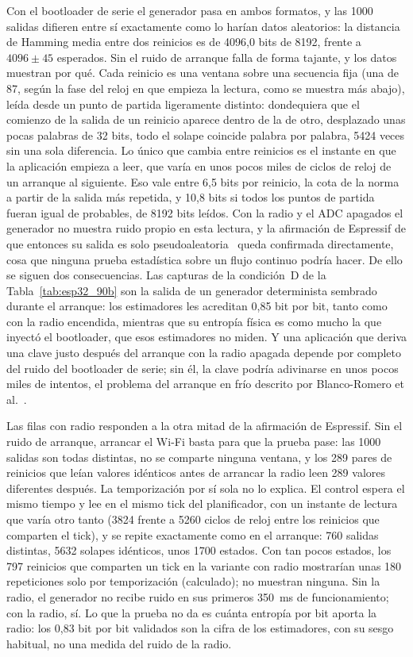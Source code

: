 Con el bootloader de serie el generador pasa en ambos formatos, y las
1000 salidas difieren entre sí exactamente como lo harían datos
aleatorios: la distancia de Hamming media entre dos reinicios es de 4096,0
bits de 8192, frente a $4096 \pm 45$ esperados. Sin el ruido de arranque
falla de forma tajante, y los datos muestran por qué. Cada reinicio es una
ventana sobre una secuencia fija (una de 87, según la fase del reloj en
que empieza la lectura, como se muestra más abajo), leída desde un punto de partida
ligeramente distinto: dondequiera que el comienzo de la salida de un
reinicio aparece dentro de la de otro, desplazado unas pocas palabras de
32 bits, todo el solape coincide palabra por palabra, 5424 veces sin una
sola diferencia. Lo único que cambia entre reinicios es el instante en que
la aplicación empieza a leer, que varía en unos pocos miles de ciclos de
reloj de un arranque al siguiente. Eso vale entre 6,5 bits por reinicio,
la cota de la norma a partir de la salida más repetida, y 10,8 bits si
todos los puntos de partida fueran igual de probables, de 8192 bits leídos.
Con la radio y el ADC apagados el generador no muestra ruido propio en
esta lectura, y la
afirmación de Espressif de que entonces su salida es solo
pseudoaleatoria~\cite{espressif_idf_random} queda confirmada directamente,
cosa que ninguna prueba estadística sobre un flujo continuo podría hacer.
De ello se siguen dos consecuencias. Las capturas de la condición~D de la
Tabla~\ref{tab:esp32_90b} son la salida de un generador determinista
sembrado durante el arranque: los estimadores les acreditan 0,85 bit por
bit, tanto como con la radio encendida, mientras que su entropía física es
como mucho la que inyectó el bootloader, que esos estimadores no miden. Y
una aplicación que deriva una clave justo después del arranque con la
radio apagada depende por completo del ruido del bootloader de serie; sin
él, la clave podría adivinarse en unos pocos miles de intentos, el
problema del arranque en frío descrito por Blanco-Romero
et al.~\cite{blancoromero_2026_entropy}.

Las filas con radio responden a la otra mitad de la afirmación de
Espressif. Sin el ruido de arranque, arrancar el Wi-Fi basta para que la
prueba pase: las 1000 salidas son todas distintas, no se comparte ninguna
ventana, y los 289 pares de reinicios que leían valores idénticos antes de
arrancar la radio leen 289 valores diferentes después. La temporización
por sí sola no lo explica. El control espera el mismo tiempo y lee en el
mismo tick del planificador, con un instante de lectura que varía otro
tanto (3824 frente a 5260 ciclos de reloj entre los reinicios que
comparten el tick), y se repite exactamente como en el arranque: 760
salidas distintas, 5632 solapes idénticos, unos 1700 estados. Con tan
pocos estados, los 797 reinicios que comparten un tick en la variante con
radio mostrarían unas 180 repeticiones solo por temporización (calculado); no muestran
ninguna. Sin la radio, el generador no recibe ruido en sus primeros
350~ms de funcionamiento; con la radio, sí. Lo que la prueba no da es
cuánta entropía por bit aporta la radio: los 0,83 bit por bit validados
son la cifra de los estimadores, con su sesgo habitual, no una medida del
ruido de la radio.

